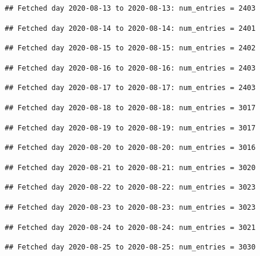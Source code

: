 \documentclass[]{article}
\begin{document}
\begin{verbatim}
## Fetched day 2020-08-13 to 2020-08-13: num_entries = 2403
\end{verbatim}

\begin{verbatim}
## Fetched day 2020-08-14 to 2020-08-14: num_entries = 2401
\end{verbatim}

\begin{verbatim}
## Fetched day 2020-08-15 to 2020-08-15: num_entries = 2402
\end{verbatim}

\begin{verbatim}
## Fetched day 2020-08-16 to 2020-08-16: num_entries = 2403
\end{verbatim}

\begin{verbatim}
## Fetched day 2020-08-17 to 2020-08-17: num_entries = 2403
\end{verbatim}

\begin{verbatim}
## Fetched day 2020-08-18 to 2020-08-18: num_entries = 3017
\end{verbatim}

\begin{verbatim}
## Fetched day 2020-08-19 to 2020-08-19: num_entries = 3017
\end{verbatim}

\begin{verbatim}
## Fetched day 2020-08-20 to 2020-08-20: num_entries = 3016
\end{verbatim}

\begin{verbatim}
## Fetched day 2020-08-21 to 2020-08-21: num_entries = 3020
\end{verbatim}

\begin{verbatim}
## Fetched day 2020-08-22 to 2020-08-22: num_entries = 3023
\end{verbatim}

\begin{verbatim}
## Fetched day 2020-08-23 to 2020-08-23: num_entries = 3023
\end{verbatim}

\begin{verbatim}
## Fetched day 2020-08-24 to 2020-08-24: num_entries = 3021
\end{verbatim}

\begin{verbatim}
## Fetched day 2020-08-25 to 2020-08-25: num_entries = 3030
\end{verbatim}
\end{document}
